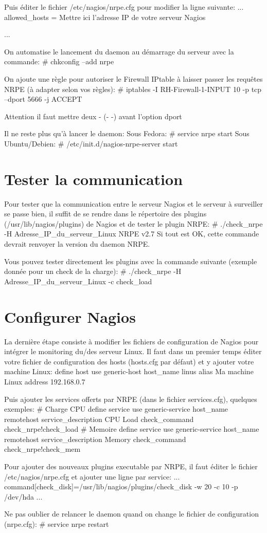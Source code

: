 Puis éditer le fichier /etc/nagios/nrpe.cfg pour modifier la ligne suivante:
...
allowed_hosts = Mettre ici l'adresse IP de votre serveur Nagios

...

On automatise le lancement du daemon au démarrage du serveur avec la commande:
# chkconfig --add nrpe

On ajoute une règle pour autoriser le Firewall IPtable à laisser passer les requêtes NRPE (à adapter selon vos règles):
# iptables -I RH-Firewall-1-INPUT 10 -p tcp --dport 5666 -j ACCEPT

Attention il faut mettre deux - (- -) avant l'option dport

Il ne reste plus qu'à lancer le daemon:
Sous Fedora:
# service nrpe start
Sous Ubuntu/Debien:
# /etc/init.d/nagios-nrpe-server start

\section {Tester la communication}
Pour tester que la communication entre le serveur Nagios et le serveur à surveiller se passe bien, il suffit de se rendre dans le répertoire des plugins (/usr/lib/nagios/plugins) de Nagios et de tester le plugin NRPE:
# ./check_nrpe -H Adresse_IP_du_serveur_Linux
NRPE v2.7
Si tout est OK, cette commande devrait renvoyer la version du daemon NRPE.

Vous pouvez tester directement les plugins avec la commande suivante (exemple donnée pour un check de la charge):
# ./check_nrpe -H Adresse_IP_du_serveur_Linux -c check_load

\section {Configurer Nagios}
La dernière étape consiste à modifier les fichiers de configuration de Nagios pour intégrer le monitoring du/des serveur Linux. Il faut dans un premier temps éditer votre fichier de configuration des hosts (hosts.cfg par défaut) et y ajouter votre machine Linux:
define host {
use generic-host
host_name linus
alias Ma machine Linux
address 192.168.0.7
}

Puis ajouter les services offerts par NRPE (dans le fichier services.cfg), quelques exemples:
# Charge CPU
define service{
use generic-service
host_name remotehost
service_description CPU Load
check_command check_nrpe!check_load
}
# Memoire
define service{
use generic-service
host_name remotehost
service_description Memory
check_command check_nrpe!check_mem
}

Pour ajouter des nouveaux plugins executable par NRPE, il faut éditer le fichier /etc/nagios/nrpe.cfg et ajouter une ligne par service:
...
command[check_disk]=/usr/lib/nagios/plugins/check_disk -w 20 -c 10 -p /dev/hda
...

Ne pas oublier de relancer le daemon quand on change le fichier de configuration (nrpe.cfg):
# service nrpe restart



